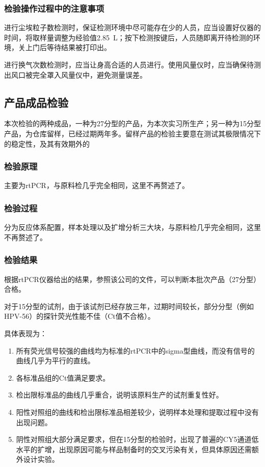 \documentclass[cn,black,12pt,normal]{elegantnote}
\begin{document}
\subsubsection{检验操作过程中的注意事项}
进行尘埃粒子数检测时，保证检测环境中尽可能存在少的人员，应当设置好仪器的时间，将取样量调整为经验值\SI{2.85}{\liter}；按下检测按键后，人员随即离开待检测的环境，关上门后等待结果被打印出。

进行换气次数检测时，应当让身高合适的人员进行。使用风量仪时，应当确保待测出风口被完全罩入风量仪中，避免测量误差。

\subsection{产品成品检验}

本次检验的两种成品，一种为27分型的产品，为本次实习所生产；另一种为15分型产品，为仓库留样，已经过期两年多。留样产品的检验主要意在测试其极限情况下的稳定性，及其有效期外的

\subsubsection{检验原理}
主要为rtPCR，与原料检几乎完全相同，这里不再赘述了。

\subsubsection{检验过程}
分为反应体系配置，样本处理以及扩增分析三大块，与原料检几乎完全相同，这里不再赘述了。

\subsubsection{检验结果}
根据rtPCR仪器给出的结果，参照该公司的文件，可以判断本批次产品（27分型）合格。

对于15分型的试剂，由于该试剂已经存放三年，过期时间较长，部分分型（例如HPV-56）的探针荧光性能不佳（Ct值不合格）。

具体表现为：
\begin{enumerate}
    \item 所有荧光信号较强的曲线均为标准的rtPCR中的sigma型曲线，而没有信号的曲线几乎为平行的直线。
    \item 各标准品组的Ct值满足要求。
    \item 检出限标准品的曲线几乎重合，说明该原料生产的试剂重复性好。
    \item 阳性对照组的曲线和检出限标准品相差较少，说明样本处理和提取过程中没有出现问题。
    \item 阴性对照组大部分满足要求，但在15分型的检验时，出现了普遍的CY5通道低水平的扩增，出现原因可能与样品制备时的交叉污染有关，但具体原因还需额外设计实验。
\end{enumerate}
\end{document}
